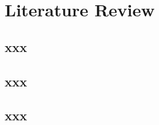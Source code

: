 \chapter{Literature Review}
\begingroup
\justifying
\setlength{\parindent}{0pt}
\setlength{\parskip}{0.5\baselineskip}
\titlespacing{\chapter}{0pt}{0pt}{0pt}
\titlespacing{\section}{0pt}{0pt}{0pt}

\section{xxx}
\section{xxx}
\section{xxx}

\endgroup